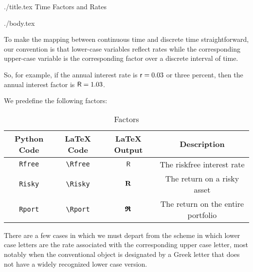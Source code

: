 \documentclass[12pt]{econtex}
\begin{document}
\begin{verbatimwrite}{./title.tex}
Time Factors and Rates
\end{verbatimwrite}


\begin{verbatimwrite}{./body.tex}

To make the mapping between continuous time and discrete time straightforward, our 
convention is that lower-case variables reflect rates while the corresponding upper-case 
variable is the corresponding factor over a discrete interval of time.  

So, for example, if the annual interest rate is $\mathsf{r}=0.03$ or three percent, then 
the annual interest factor is $\mathsf{R}=1.03$.  

We predefine the following factors:
\begin{table}[h]
	\centering
	\begin{tabular}{||>{\ttfamily}cccc||} 		
		\hline
		 Python Code & LaTeX Code & LaTeX Output & Description 
\\ \hline  \texttt{Rfree}    & \verb|\Rfree|    & $\mathsf{R}$    & The riskfree interest rate 
\\ \texttt{Risky}    & \verb|\Risky|    & $\mathbf{R}$    & The return on a risky asset
\\ \texttt{Rport}    & \verb|\Rport|    & $\pmb{\mathfrak{R}}$    & The return on the entire portfolio
\\	\hline
	\end{tabular}
	\caption{Factors}
	\label{table:Factors}
\end{table}	

There are a few cases in which we must depart from the scheme in which lower case letters are 
the rate associated with the corresponding upper case letter, most notably when the conventional
object is designated by a Greek letter that does not have a widely recognized lower case version.


\end{verbatimwrite}
\end{document}
